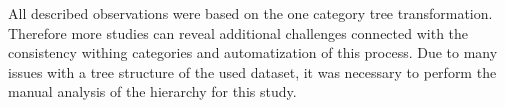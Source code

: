 All described observations were based on the one category tree transformation. Therefore more studies can reveal additional challenges connected with the consistency withing categories and automatization of this process. Due to many issues with a tree structure of the used dataset, it was necessary to perform the manual analysis of the hierarchy for this study. 




